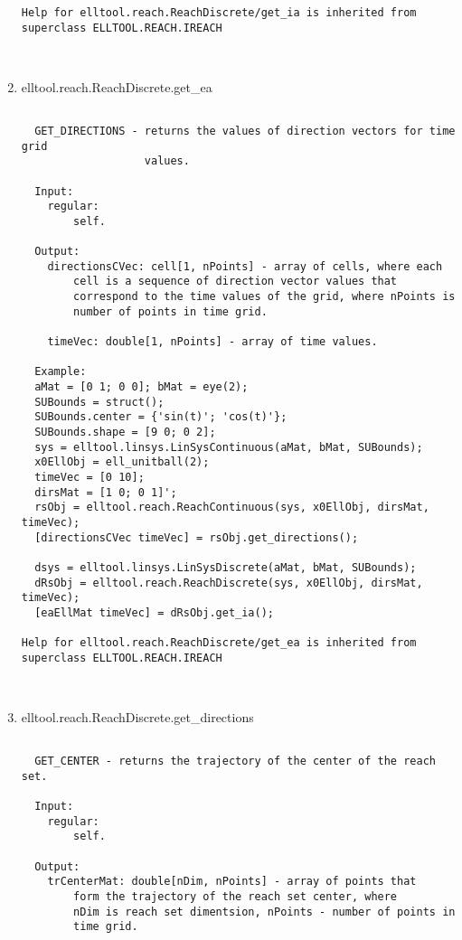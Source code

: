 \begin{enumerate}
\begin{lstlisting}
Help for elltool.reach.ReachDiscrete/get_ia is inherited from superclass ELLTOOL.REACH.IREACH



\end{lstlisting}
\fontfamily{\familydefault}
\selectfont
\item {elltool.reach.ReachDiscrete.get\_ea}
\selectfont
\begin{lstlisting}

  GET_DIRECTIONS - returns the values of direction vectors for time grid
                   values.

  Input:
    regular:
        self.

  Output:
    directionsCVec: cell[1, nPoints] - array of cells, where each
        cell is a sequence of direction vector values that
        correspond to the time values of the grid, where nPoints is
        number of points in time grid.

    timeVec: double[1, nPoints] - array of time values.

  Example:
  aMat = [0 1; 0 0]; bMat = eye(2);
  SUBounds = struct();
  SUBounds.center = {'sin(t)'; 'cos(t)'};
  SUBounds.shape = [9 0; 0 2];
  sys = elltool.linsys.LinSysContinuous(aMat, bMat, SUBounds);
  x0EllObj = ell_unitball(2);
  timeVec = [0 10];
  dirsMat = [1 0; 0 1]';
  rsObj = elltool.reach.ReachContinuous(sys, x0EllObj, dirsMat, timeVec);
  [directionsCVec timeVec] = rsObj.get_directions();

  dsys = elltool.linsys.LinSysDiscrete(aMat, bMat, SUBounds);
  dRsObj = elltool.reach.ReachDiscrete(sys, x0EllObj, dirsMat, timeVec);
  [eaEllMat timeVec] = dRsObj.get_ia();

Help for elltool.reach.ReachDiscrete/get_ea is inherited from superclass ELLTOOL.REACH.IREACH



\end{lstlisting}
\fontfamily{\familydefault}
\selectfont
\item {elltool.reach.ReachDiscrete.get\_directions}
\selectfont
\begin{lstlisting}

  GET_CENTER - returns the trajectory of the center of the reach set.

  Input:
    regular:
        self.

  Output:
    trCenterMat: double[nDim, nPoints] - array of points that
        form the trajectory of the reach set center, where
        nDim is reach set dimentsion, nPoints - number of points in
        time grid.


\end{lstlisting}
\end{enumerate}
